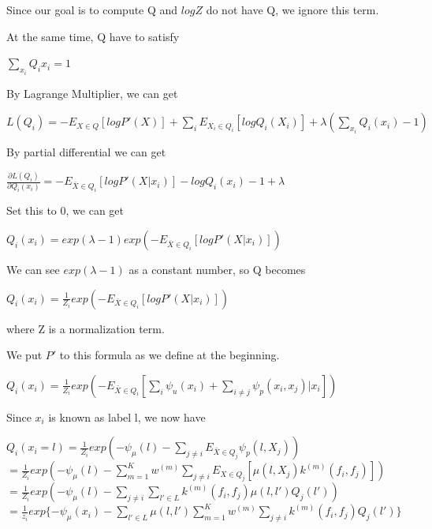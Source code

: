\documentclass{article}
\begin{document}
Since our goal is to compute Q and $logZ$ do not have Q, we ignore this term.

At the same time, Q have to satisfy

\begin{center}
$\sum_{x_{i}}Q_{i}x_{i}=1$
\end{center}

By Lagrange Multiplier, we can get

\begin{center}
$L(Q_{i})=-E_{X\in Q}[logP'(X)]+\sum_{i}E_{X_{i}\in Q_{i}}[logQ_{i}(X_{i})]+\lambda (\sum_{x_{i}}Q_{i}(x_{i})-1)$
\end{center}

By partial differential we can get

\begin{center}
$\frac{\partial L(Q_{i})}{\partial Q_{i}(x_{i})}=-E_{\bar{X}\in Q_{i}}[logP'(X|x_{i})]-logQ_{i}(x_{i})-1+\lambda$
\end{center}

Set this to 0, we can get

\begin{center}
$Q_{i}(x_{i})=exp(\lambda -1)exp(-E_{\bar{X}\in Q_{i}}[logP'(X|x_{i})])$
\end{center}

We can see $exp(\lambda -1)$ as a constant number, so Q becomes

\begin{center}
$Q_{i}(x_{i})=\frac{1}{Z_{i}} exp(-E_{\bar{X}\in Q_{i}}[logP'(X|x_{i})])$
\end{center}
where Z is a normalization term.

We put $P'$ to this formula as we define at the beginning.

\begin{center}
$Q_{i}(x_{i})=\frac{1}{Z_{i}} exp(-E_{\bar{X}\in Q_{i}}[\sum_{i}{\psi_{u}(x_{i})}+\sum_{i\neq j}{\psi_{p}(x_{i}, x_{j})|x_{i}}])$
\end{center}

Since $x_{i}$ is known as label l, we now have

$Q_{i}(x_{i}=l)=\frac{1}{Z_{i}} exp(-\psi_{\mu}(l)-\sum_{j \neq i}E_{\bar{X}\in Q_{j}}\psi_{p}(l,X_{j}))$ \\
$= \frac{1}{Z_{i}} exp(-\psi_{\mu}(l)-\sum\limits_{m=1}^K w^{(m)}\sum\limits_{j \neq i}E_{X \in Q_{j}}[\mu(l,X_{j})k^{(m)}(f_{i},f_{j})])$ \\
$= \frac{1}{Z_{i}} exp(-\psi_{\mu}(l)-\sum\limits_{j\neq i}\sum\limits_{l'\in L} k^{(m)}(f_{i},f_{j})\mu(l,l')Q_{j}(l'))$ \\
$= \frac{1}{z_{i}}exp\{-\psi_{\mu}(x_{i})-\sum_{l'\in L}\mu(l,l')\sum\limits_{m=1}^K w^{(m)}\sum_{j\neq i}k^{(m)}(f_{i},f_{j})Q_{j}(l')\}$
\end{document}
